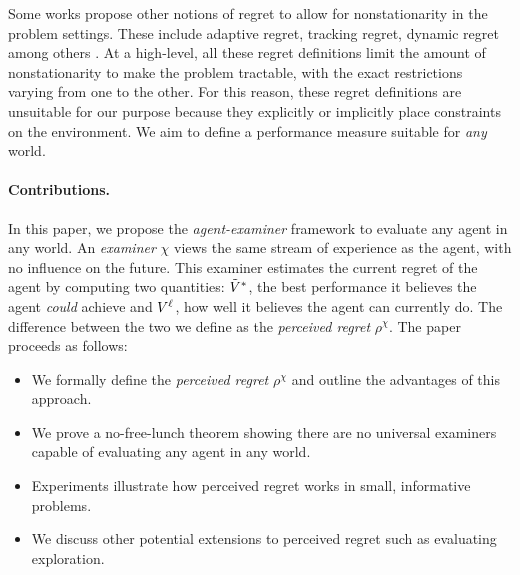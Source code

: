 Some works propose other notions of regret to allow for nonstationarity in the problem settings. These include adaptive regret, tracking regret, dynamic regret among others \citep{hazan2009efficient, herbster1998tracking, zinkevich2003online, wei2021master, besbes2019optimal}.
At a high-level, all these regret definitions limit the amount of nonstationarity to make the problem tractable, with the exact restrictions varying from one to the other. 
For this reason, these regret definitions are unsuitable for our purpose because they explicitly or implicitly place constraints on the environment. We aim to define a performance measure suitable for \textit{any} world. 

\paragraph{Contributions.}
In this paper, we propose the \textit{agent-examiner} framework to evaluate any agent in any world.
An \textit{examiner} $\chi$ views the same stream of experience as the agent, with no influence on the future. This examiner estimates the current regret of the agent by computing two quantities: $\tilde{V}^*$, the best performance it believes the agent \textit{could} achieve and $V^{\ell}$, how well it believes the agent can currently do. The difference between the two we define as the \textit{perceived regret} $\rho^\chi$. 
The paper proceeds as follows:
\begin{itemize}
    \item We formally define the \textit{perceived regret} $\rho^\chi$ and outline the advantages of this approach.
    \item We prove a no-free-lunch theorem showing there are no universal examiners capable of evaluating any agent in any world.
    \item Experiments illustrate how perceived regret works in small, informative problems.
    \item We discuss other potential extensions to perceived regret such as evaluating exploration.
\end{itemize}



